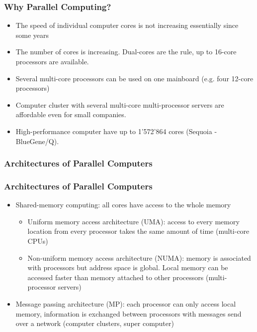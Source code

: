\begin{frame}
\frametitle<presentation>{Why Parallel Computing?}

\begin{itemize}
\item The speed of individual computer cores is not increasing
essentially since some years
\item The number of cores is increasing. Dual-cores are the rule,
up to 16-core processors are available.
\item Several multi-core processors can be used on one mainboard (e.g. four 12-core processors)
\item Computer cluster with several multi-core multi-processor servers are affordable even for small companies.
\item High-performance computer have up to 1'572'864 cores (Sequoia - BlueGene/Q).
\end{itemize}

\end{frame}


\subsubsection{Architectures of Parallel Computers}

\begin{frame}
\frametitle<presentation>{Architectures of Parallel Computers}
\begin{itemize}
\item Shared-memory computing: all cores have access to the whole memory
\begin{itemize}
\item Uniform memory access architecture (UMA): access to every memory location from every processor takes the
same amount of time (multi-core CPUs)
\item Non-uniform memory access architecture (NUMA): memory is associated with processors but address space is
global. Local memory can be accessed faster than memory attached
to other processors (multi-processor servers)
\end{itemize}
\item Message passing architecture (MP): each processor can only access local memory, information is exchanged
between processors with messages send over a network (computer clusters, super computer)
\end{itemize}
\end{frame}


